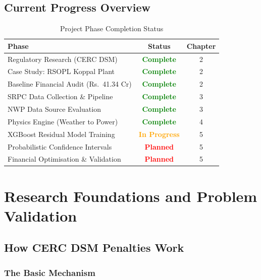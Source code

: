 \documentclass[12pt,a4paper]{report}
\begin{document}
\section{Current Progress Overview}

\begin{table}[H]
    \centering
    \caption{Project Phase Completion Status}
    \begin{tabular}{p{6.5cm}cc}
        \toprule
        \textbf{Phase} & \textbf{Status} & \textbf{Chapter} \\
        \midrule
        Regulatory Research (CERC DSM) & \textcolor{green}{\textbf{Complete}} & 2 \\
        Case Study: RSOPL Koppal Plant & \textcolor{green}{\textbf{Complete}} & 2 \\
        Baseline Financial Audit (Rs.\ 41.34 Cr) & \textcolor{green}{\textbf{Complete}} & 2 \\
        SRPC Data Collection \& Pipeline & \textcolor{green}{\textbf{Complete}} & 3 \\
        NWP Data Source Evaluation & \textcolor{green}{\textbf{Complete}} & 3 \\
        Physics Engine (Weather to Power) & \textcolor{green}{\textbf{Complete}} & 4 \\
        XGBoost Residual Model Training & \textcolor{orange}{\textbf{In Progress}} & 5 \\
        Probabilistic Confidence Intervals & \textcolor{red}{\textbf{Planned}} & 5 \\
        Financial Optimisation \& Validation & \textcolor{red}{\textbf{Planned}} & 5 \\
        \bottomrule
    \end{tabular}
\end{table}

\chapter{Research Foundations and Problem Validation}

\section{How CERC DSM Penalties Work}

\subsection{The Basic Mechanism}
\end{document}
